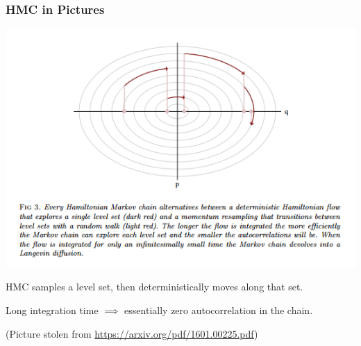 \documentclass[xcolor=dvipsnames]{beamer}
\begin{document}
\begin{frame}
\frametitle{HMC in Pictures}
\begin{center}
\includegraphics[height=0.5\textheight]{hmc.png}
\end{center}

HMC samples a level set, then deterministically moves along that set.

\vspace{0.3cm}

Long integration time $\implies$ essentially zero autocorrelation in the chain.

\vspace{0.3cm}

(Picture stolen from \url{https://arxiv.org/pdf/1601.00225.pdf})
\end{frame}
\end{document}
